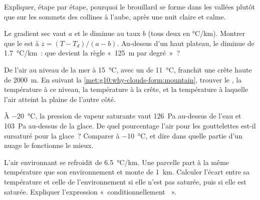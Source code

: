 \begin{exercise}[$\star\star$]\label{exo:g10:why-clouds-form:11}
Expliquer, étape par étape, pourquoi le brouillard se forme dans les vallées
plutôt que sur les sommets des collines à l'aube, après une nuit claire et
calme.
\end{exercise}

\begin{exercise}[$\star\star\star$]\label{exo:g10:why-clouds-form:12}
Le gradient sec vaut $a$ et le  diminue au taux $b$ (tous deux
en \unit{\degreeCelsius/km}). Montrer que le  est à
$z = (T - T_d)/(a - b)$. Au-dessus d'un haut plateau, le 
diminue de \qty{1.7}{\degreeCelsius/km}~: que devient la règle
«~\qty{125}{m} par degré~»~?
\end{exercise}

\begin{exercise}[$\star\star\star$]\label{exo:g10:why-clouds-form:13}
De l'air au niveau de la mer à \qty{15}{\degreeCelsius}, avec un  de \qty{11}{\degreeCelsius}, franchit une crête haute de
\qty{2000}{m}. En suivant la \cref{met:g10:why-clouds-form:mountain},
trouver le , la température à ce niveau, la
température à la crête, et la température à laquelle l'air atteint la
plaine de l'autre côté.
\end{exercise}

\begin{exercise}[$\star\star\star$]\label{exo:g10:why-clouds-form:14}
À \qty{-20}{\degreeCelsius}, la pression de vapeur saturante vaut
\qty{126}{Pa} au-dessus de l'eau et \qty{103}{Pa} au-dessus de la glace. De
quel pourcentage l'air  pour les gouttelettes est-il sursaturé pour
la glace~? Comparer à \qty{-10}{\degreeCelsius}, et dire dans quelle partie
d'un nuage le  fonctionne le mieux.
\end{exercise}

\begin{exercise}[$\star\star\star$]\label{exo:g10:why-clouds-form:15}
L'air environnant se refroidit de \qty{6.5}{\degreeCelsius/km}. Une
parcelle part à la même température que son environnement et monte de
\qty{1}{km}. Calculer l'écart entre sa température et celle de
l'environnement si elle n'est pas saturée, puis si elle est saturée.
Expliquer l'expression «~conditionnellement ~».
\end{exercise}

